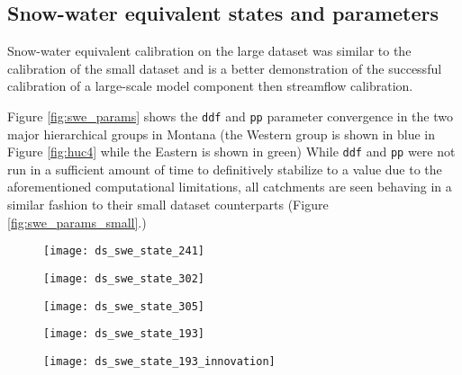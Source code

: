 \subsection{Snow-water equivalent states and parameters}

Snow-water equivalent calibration on the large dataset was similar to the calibration of the small dataset and is a better demonstration of the successful calibration of a large-scale model component then streamflow calibration.

Figure \ref{fig:swe_params} shows the \texttt{ddf} and \texttt{pp} parameter convergence in the two major hierarchical groups in Montana (the Western group is shown in blue in Figure \ref{fig:huc4} while the Eastern is shown in green)  While \texttt{ddf} and \texttt{pp} were not run in a sufficient amount of time to definitively stabilize to a value due to the aforementioned computational limitations, all catchments are seen behaving in a similar fashion to their small dataset counterparts (Figure \ref{fig:swe_params_small}.)

\begin{figure}
\centering
\begin{minipage}{.33\textwidth}
  \centering
  \texttt{[image: ds\_swe\_state\_241]}
  \label{fig:ds_swe_state_241}
\end{minipage}%
\begin{minipage}{.33\textwidth}
  \centering
  \texttt{[image: ds\_swe\_state\_302]}
  \label{fig:ds_swe_state_302}
\end{minipage}
\begin{minipage}{.33\textwidth}
  \centering
  \texttt{[image: ds\_swe\_state\_305]}
  \label{fig:ds_swe_state_305}
\end{minipage}
\label{fig:swe_state}
\end{figure}

\begin{figure}
\centering
\begin{minipage}{.48\textwidth}
  \centering
  \texttt{[image: ds\_swe\_state\_193]}
  \label{fig:ds_swe_state_193}
\end{minipage}%
\begin{minipage}{.48\textwidth}
  \centering
  \texttt{[image: ds\_swe\_state\_193\_innovation]}
  \label{fig:ds_swe_state_193_innovation}
\end{minipage}
\label{fig:swestate193}
\end{figure}


